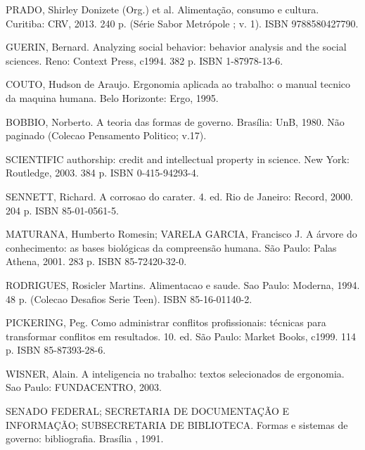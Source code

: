 {{        PRADO, Shirley Donizete (Org.) et al. Alimentação, consumo e cultura. Curitiba: CRV, 2013. 240 p. (Série Sabor Metrópole ; v. 1). ISBN 9788580427790.

        GUERIN, Bernard. Analyzing social behavior: behavior analysis and the social sciences. Reno: Context Press, c1994. 382 p. ISBN 1-87978-13-6.

        COUTO, Hudson de Araujo. Ergonomia aplicada ao trabalho: o manual tecnico da maquina humana. Belo Horizonte: Ergo, 1995.

        BOBBIO, Norberto. A teoria das formas de governo. Brasília: UnB, 1980. Não paginado (Colecao Pensamento Politico; v.17).
    }{
        SCIENTIFIC authorship: credit and intellectual property in science. New York: Routledge, 2003. 384 p. ISBN 0-415-94293-4.

        SENNETT, Richard. A corrosao do carater. 4. ed. Rio de Janeiro: Record, 2000. 204 p. ISBN 85-01-0561-5.

        MATURANA, Humberto Romesin; VARELA GARCIA, Francisco J. A árvore do conhecimento: as bases biológicas da compreensão humana. São Paulo: Palas Athena, 2001. 283 p. ISBN 85-72420-32-0.

        RODRIGUES, Rosicler Martins. Alimentacao e saude. Sao Paulo: Moderna, 1994. 48 p. (Colecao Desafios Serie Teen). ISBN 85-16-01140-2.

        PICKERING, Peg. Como administrar conflitos profissionais: técnicas para transformar conflitos em resultados. 10. ed. São Paulo: Market Books, c1999. 114 p. ISBN 85-87393-28-6.

        WISNER, Alain. A inteligencia no trabalho: textos selecionados de ergonomia. Sao Paulo: FUNDACENTRO, 2003.

        SENADO FEDERAL; SECRETARIA DE DOCUMENTAÇÃO E INFORMAÇÃO; SUBSECRETARIA DE BIBLIOTECA. Formas e sistemas de governo: bibliografia. Brasília , 1991.
    }
}